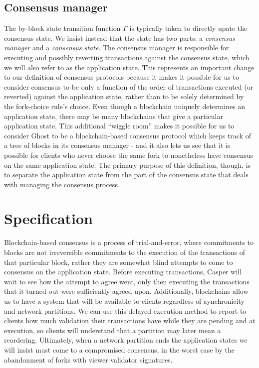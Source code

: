 \documentclass[11pt,a4paper]{article}
\begin{document}
\subsection{Consensus manager}

The by-block state transition function $\Gamma$ is typically taken to directly upate the consensus state. We insist instead that the state has two parts: a \emph{consensus manager} and a \emph{consensus state}. The consensus manager is responsible for executing and possibly reverting transactions against the consensus state, which we will also refer to as the application state. This represents an important change to our definition of consensus protocols because it makes it possible for us to consider consensus to be only a function of the order of transactions executed (or reverted) against the application state, rather than to be solely determined by the fork-choice rule's choice. Even though a blockchain uniquely determines an application state, there may be many blockchains that give a particular application state. This additional ``wiggle room'' makes it possible for us to consider Ghost to be a blockchain-based consensus protocol which keeps track of a tree of blocks in its consensus manager - and it also lets us see that it is possible for clients who never choose the same fork to nonetheless have consensus on the same application state. The primary purpose of this definition, though, is to separate the application state from the part of the consensus state that deals with managing the consensus process.

\section{Specification}

Blockchain-based consensus is a process of trial-and-error, where commitments to blocks are not irreversible commitments to the execution of the transactions of that particular block, rather they are somewhat blind attempts to come to consensus on the application state. Before executing transactions, Casper will wait to see how the attempt to agree went, only then executing the transactions that it turned out were sufficiently agreed upon. Additionally, blockchains allow us to have a system that will be available to clients regardless of aynchronicity and network partitions. We can use this delayed-execution method to report to clients how much validation their transactions have while they are pending and at execution, so clients will understand that a partition may later mean a reordering. Ultimately, when a network partition ends the application states we will insist must come to a compromised consensus, in the worst case by the abandonment of forks with viewer validator signatures. 
\end{document}
